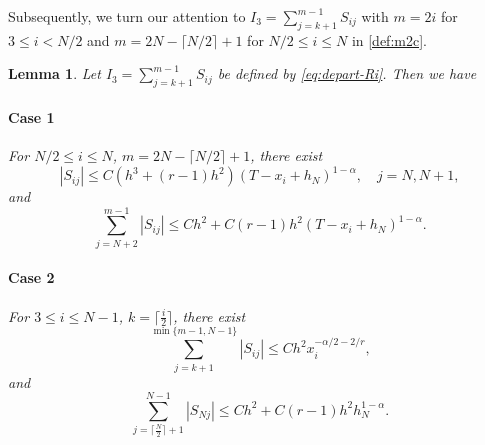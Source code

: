 \documentclass{amsart}
\newtheorem{lemma}[theorem]{Lemma}
\theoremstyle{definition}
\theoremstyle{remark}
\numberwithin{equation}{section}
\begin{document}
Subsequently, we turn our attention to $I_3=\sum_{j=k+1}^{m-1} S_{ij}$ 
with $m=2i$ for $3\le i<N/2$ and $m=2N-\lceil N/2 \rceil +1$ for $N/2 \le i \le N$ in \eqref{def:m2c}.
  \begin{lemma} \label{lmm:estimate-Sij}
  Let \(I_3 = \sum_{j=k+1}^{m-1} S_{ij}\) be defined by \eqref{eq:depart-Ri}. Then we have
    \paragraph{Case 1}
    For \(N/2 \le i \le N\), $m=2N-\lceil N/2 \rceil +1$, there exist
    \begin{equation*}
      |S_{ij}| \le C (h^3 + (r-1)h^2) (T-x_i+h_N)^{1-\alpha}, \quad j=N, N+1,
    \end{equation*}
    and
    \begin{equation*}
      \sum_{j=N+2}^{m-1} \left|S_{ij} \right| 
      \le C h^2 + C (r-1) h^2 (T-x_i + h_N)^{1-\alpha}.
    \end{equation*}
    \paragraph{Case 2}
    For \(3\le i \le N-1\), $k=\lceil \frac{i}{2} \rceil$,  %
    there exist
    \begin{equation*}
       \sum_{j=k+1}^{\min\{m-1, N-1\}} \left|S_{ij} \right| \le C h^2 x_i^{-\alpha/2-2/r},
    \end{equation*}
    and
    \begin{equation*}
      \sum_{j=\lceil\frac{N}{2}\rceil+1}^{N-1} \left|S_{Nj} \right| 
      \le C h^2 + C (r-1) h^2 h_N^{1-\alpha}.
    \end{equation*}
  \end{lemma}
\end{document}
